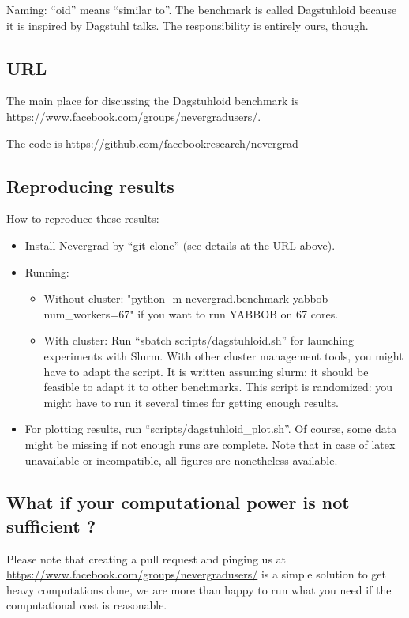 \documentclass{article}
\begin{document}
Naming: “oid” means “similar to”. The benchmark is called Dagstuhloid because it is inspired by Dagstuhl talks. The responsibility is entirely ours, though.

\subsection{URL}
The main place for discussing the Dagstuhloid benchmark is \url{https://www.facebook.com/groups/nevergradusers/}. 

The code is https://github.com/facebookresearch/nevergrad

\subsection{Reproducing results}
How to reproduce these results:
\begin{itemize}
\item Install Nevergrad by “git clone” (see details at the URL above).
\item  Running:
\begin{itemize}
\item Without cluster: "python -m nevergrad.benchmark yabbob --num\_workers=67" if you want to run YABBOB on 67 cores. 
\item With cluster: Run “sbatch scripts/dagstuhloid.sh” for launching experiments with Slurm. With other cluster management tools, you might have to adapt the script. It is written assuming slurm: it should be feasible to adapt it to other benchmarks. This script is randomized: you might have to run it several times for getting enough results.
\end{itemize}
\item For plotting results, run “scripts/dagstuhloid\_plot.sh”. Of course, some data might be missing if not enough runs are complete. Note that in case of latex unavailable or incompatible, all figures are nonetheless available.
\end{itemize}

\subsection{What if your computational power is not sufficient ?}
Please note that creating a pull request and pinging us at \url{https://www.facebook.com/groups/nevergradusers/} is a simple solution to get heavy computations done, we are more than happy to run what you need if the computational cost is reasonable. 
\end{document}
